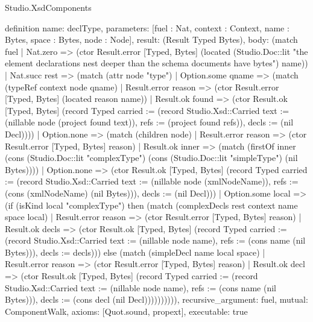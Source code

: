 \begin{lexlean}{Studio.XsdComponents}
\begin{semanticmodule}
definition{
  name: declType,
  parameters: [fuel : Nat, context : Context, name : Bytes, space : Bytes, node : Node],
  result: (Result Typed Bytes),
  body: (match fuel
    | Nat.zero => (ctor Result.error [Typed, Bytes] (located (Studio.Doc::lit "the element declarations nest deeper than the schema documents have bytes") name))
    | Nat.succ rest => (match (attr node "type")
      | Option.some qname => (match (typeRef context node qname)
        | Result.error reason => (ctor Result.error [Typed, Bytes] (located reason name))
        | Result.ok found => (ctor Result.ok [Typed, Bytes] (record Typed {carried := (record Studio.Xsd::Carried {text := (nillable node (project found text)), refs := (project found refs)}), decls := (nil Decl)})))
      | Option.none => (match (children node)
        | Result.error reason => (ctor Result.error [Typed, Bytes] reason)
        | Result.ok inner => (match (firstOf inner (cons (Studio.Doc::lit "complexType") (cons (Studio.Doc::lit "simpleType") (nil Bytes))))
          | Option.none => (ctor Result.ok [Typed, Bytes] (record Typed {carried := (record Studio.Xsd::Carried {text := (nillable node (xmlNodeName)), refs := (cons (xmlNodeName) (nil Bytes))}), decls := (nil Decl)}))
          | Option.some local => (if (isKind local "complexType") then (match (complexDecls rest context name space local)
            | Result.error reason => (ctor Result.error [Typed, Bytes] reason)
            | Result.ok decls => (ctor Result.ok [Typed, Bytes] (record Typed {carried := (record Studio.Xsd::Carried {text := (nillable node name), refs := (cons name (nil Bytes))}), decls := decls}))) else (match (simpleDecl name local space)
            | Result.error reason => (ctor Result.error [Typed, Bytes] reason)
            | Result.ok decl => (ctor Result.ok [Typed, Bytes] (record Typed {carried := (record Studio.Xsd::Carried {text := (nillable node name), refs := (cons name (nil Bytes))}), decls := (cons decl (nil Decl))})))))))),
  recursive_argument: fuel,
  mutual: ComponentWalk,
  axioms: [Quot.sound, propext],
  executable: true
}


\end{semanticmodule}
\end{lexlean}
